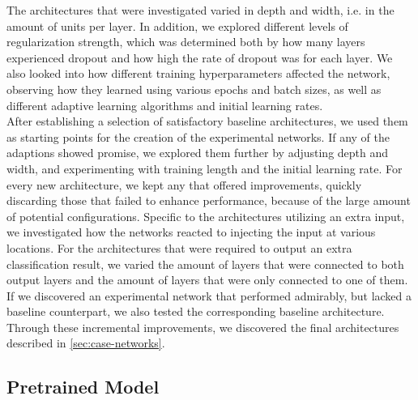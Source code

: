 \noindent The architectures that were investigated varied in depth and width, i.e. in the amount of units per layer. In addition, we explored different levels of regularization strength, which was determined both by how many layers experienced dropout and how high the rate of dropout was for each layer. We also looked into how different training hyperparameters affected the network, observing how they learned using various epochs and batch sizes, as well as different adaptive learning algorithms and initial learning rates. \\

\noindent After establishing a selection of satisfactory baseline architectures, we used them as starting points for the creation of the experimental networks. If any of the adaptions showed promise, we explored them further by adjusting depth and width, and experimenting with training length and the initial learning rate. For every new architecture, we kept any that offered improvements, quickly discarding those that failed to enhance performance, because of the large amount of potential configurations. Specific to the architectures utilizing an extra input, we investigated how the networks reacted to injecting the input at various locations. For the architectures that were required to output an extra classification result, we varied the amount of layers that were connected to both output layers and the amount of layers that were only connected to one of them. If we discovered an experimental network that performed admirably, but lacked a baseline counterpart, we also tested the corresponding baseline architecture. Through these incremental improvements, we discovered the final architectures described in \autoref{sec:case-networks}. 

\subsection{Pretrained Model}

